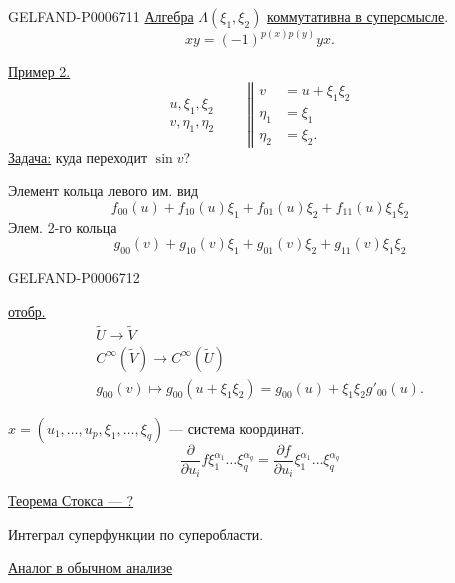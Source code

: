 \begin{GelfandAdjacentEvidence}{GELFAND-P000671}{1}
\underline{Алгебра} \(\Lambda(\xi_1,\xi_2)\) \underline{коммутативна в суперсмысле}.
\[
xy=(-1)^{p(x)p(y)}yx.
\]

\underline{Пример 2.}
\[
\begin{array}{l}
u,\xi_1,\xi_2\\
v,\eta_1,\eta_2
\end{array}
\qquad
\left\Vert\begin{aligned}
v&=u+\xi_1\xi_2\\
\eta_1&=\xi_1\\
\eta_2&=\xi_2.
\end{aligned}\right.
\]
\underline{Задача:} куда переходит \(\sin v\)?

Элемент кольца левого им. вид
\[
f_{00}(u)+f_{10}(u)\xi_1+f_{01}(u)\xi_2+f_{11}(u)\xi_1\xi_2
\]
Элем. 2-го кольца
\[
g_{00}(v)+g_{10}(v)\xi_1+g_{01}(v)\xi_2+g_{11}(v)\xi_1\xi_2
\]
\end{GelfandAdjacentEvidence}
\begin{GelfandAdjacentEvidence}{GELFAND-P000671}{2}


\underline{отобр.}
\[
\begin{gathered}
\widetilde U\longrightarrow\widetilde V\\
C^\infty(\widetilde V)\longrightarrow C^\infty(\widetilde U)\\
g_{00}(v)\mapsto g_{00}(u+\xi_1\xi_2)=g_{00}(u)+\xi_1\xi_2g'_{00}(u).
\end{gathered}
\]

\(x=(u_1,\ldots,u_p,\xi_1,\ldots,\xi_q)\) --- система координат.
\[
\frac{\partial}{\partial u_i}f\xi_1^{\alpha_1}\ldots\xi_q^{\alpha_q}
=\frac{\partial f}{\partial u_i}\xi_1^{\alpha_1}\ldots\xi_q^{\alpha_q}
\]

\underline{Теорема Стокса --- ?}

Интеграл суперфункции по суперобласти.

\underline{Аналог в обычном анализе}
\end{GelfandAdjacentEvidence}
